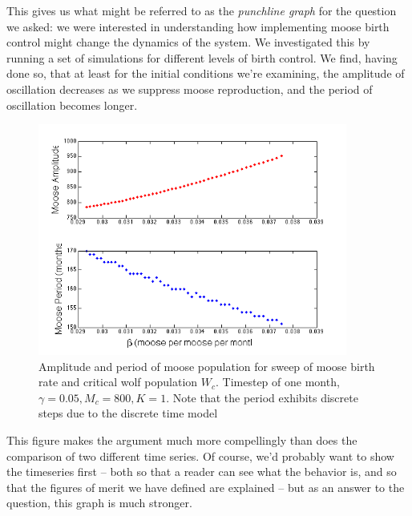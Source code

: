 This gives us what might be referred to as the {\em punchline graph} for the question we asked:  we were interested in understanding how implementing moose birth control might change the dynamics of the system.  We investigated this by running a set of simulations for different levels of birth control.  We find, having done so, that at least for the initial conditions we're examining, the amplitude of oscillation decreases as we suppress moose reproduction, and the period of oscillation becomes longer.  \begin{figure}[h!]
\includegraphics[width=4in]{figs/MooseBCSweepClean}
\caption{Amplitude and period of moose population for sweep of moose birth rate and critical wolf population $W_c$.  Timestep of one month,  $\gamma = 0.05, M_c = 800, K=1$.  Note that the period exhibits discrete steps due to the discrete time model}
\end{figure}

This figure makes the argument much more compellingly than does the comparison of two different time series.  Of course, we'd probably want to show the timeseries first -- both so that a reader can see what the behavior is, and so that the figures of merit we have defined are explained -- but as an answer to the question, this graph is much stronger.

